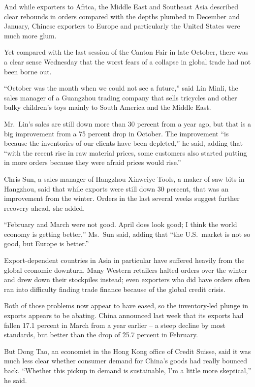 \documentclass[12pt,a4paper,onecolumn]{article}
\begin{document}
And while exporters to Africa, the Middle East and Southeast Asia described clear rebounds in orders
compared with the depths plumbed in December and January, Chinese exporters to Europe and
particularly the United States were much more glum.

Yet compared with the last session of the Canton Fair in late October, there was a clear sense
Wednesday that the worst fears of a collapse in global trade had not been borne out.

``October was the month when we could not see a future,'' said Lin Minli, the sales manager of a
Guangzhou trading company that sells tricycles and other bulky children's toys mainly to South
America and the Middle East.

Mr.~Lin's sales are still down more than 30 percent from a year ago, but that is a big improvement
from a 75 percent drop in October. The improvement ``is because the inventories of our clients have
been depleted,'' he said, adding that ``with the recent rise in raw material prices, some customers
also started putting in more orders because they were afraid prices would rise.''

Chris Sun, a sales manager of Hangzhou Xinweiye Tools, a maker of saw bits in Hangzhou, said that
while exports were still down 30 percent, that was an improvement from the winter. Orders in the
last several weeks suggest further recovery ahead, she added.

``February and March were not good. April does look good; I think the world economy is getting
better,'' Ms.~Sun said, adding that ``the U.S.~market is not so good, but Europe is better.''

Export-dependent countries in Asia in particular have suffered heavily from the global economic
downturn. Many Western retailers halted orders over the winter and drew down their stockpiles
instead; even exporters who did have orders often ran into difficulty finding trade finance because
of the global credit crisis.

Both of those problems now appear to have eased, so the inventory-led plunge in exports appears to
be abating. China announced last week that its exports had fallen 17.1 percent in March from a year
earlier -- a steep decline by most standards, but better than the drop of 25.7 percent in February.

But Dong Tao, an economist in the Hong Kong office of Credit Suisse, said it was much less clear
whether consumer demand for China's goods had really bounced back. ``Whether this pickup in demand
is sustainable, I'm a little more skeptical,'' he said.
\end{document}
